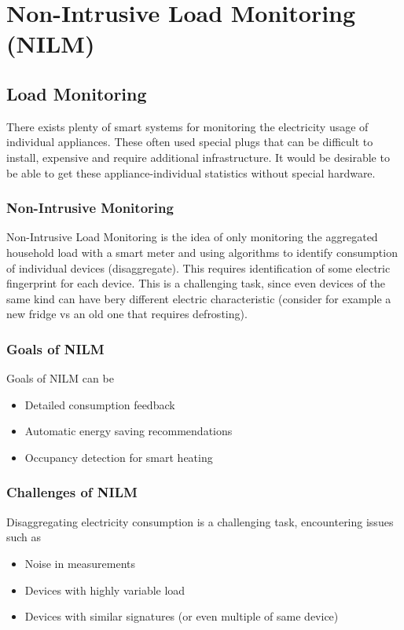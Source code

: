 \section{Non-Intrusive Load Monitoring (NILM)}

\subsection{Load Monitoring}
There exists plenty of smart systems for monitoring the electricity usage of individual appliances.
These often used special plugs that can be difficult to install, expensive and require additional infrastructure.
It would be desirable to be able to get these appliance-individual statistics without special hardware.

\subsubsection{Non-Intrusive Monitoring}
Non-Intrusive Load Monitoring is the idea of only monitoring the aggregated household load with a smart meter and using algorithms to identify consumption of individual devices (disaggregate).
This requires identification of some electric fingerprint for each device.
This is a challenging task, since even devices of the same kind can have bery different electric characteristic (consider for example a new fridge vs an old one that requires defrosting).

\subsubsection{Goals of NILM}
Goals of NILM can be
\begin{itemize}
    \item Detailed consumption feedback
    \item Automatic energy saving recommendations
    \item Occupancy detection for smart heating
\end{itemize}

\subsubsection{Challenges of NILM}
Disaggregating electricity consumption is a challenging task, encountering issues such as

\begin{itemize}
    \item Noise in measurements
    \item Devices with highly variable load
    \item Devices with similar signatures (or even multiple of same device)
\end{itemize}

